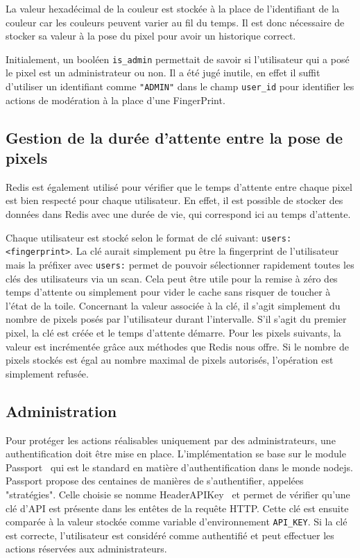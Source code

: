 La valeur hexadécimal de la couleur est stockée à la place de l'identifiant de la couleur car les couleurs peuvent varier au fil du temps. Il est donc nécessaire de stocker sa valeur à la pose du pixel pour avoir un historique correct.

Initialement, un booléen \texttt{is\_admin} permettait de savoir si l'utilisateur qui a posé le pixel est un administrateur ou non. Il a été jugé inutile, en effet il suffit d'utiliser un identifiant comme \texttt{"ADMIN"} dans le champ \texttt{user\_id} pour identifier les actions de modération à la place d'une FingerPrint.

\subsection{Gestion de la durée d'attente entre la pose de pixels}

Redis est également utilisé pour vérifier que le temps d'attente entre chaque pixel est bien respecté pour chaque utilisateur. En effet, il est possible de stocker des données dans Redis avec une durée de vie, qui correspond ici au temps d'attente.

Chaque utilisateur est stocké selon le format de clé suivant: \texttt{users:<fingerprint>}. La clé aurait simplement pu être la fingerprint de l'utilisateur mais la préfixer avec \texttt{users:} permet de pouvoir sélectionner rapidement toutes les clés des utilisateurs via un scan. Cela peut être utile pour la remise à zéro des temps d'attente ou simplement pour vider le cache sans risquer de toucher à l'état de la toile. Concernant la valeur associée à la clé, il s'agit simplement du nombre de pixels posés par l'utilisateur durant l'intervalle. S'il s'agit du premier pixel, la clé est créée et le temps d'attente démarre. Pour les pixels suivants, la valeur est incrémentée grâce aux méthodes que Redis nous offre. Si le nombre de pixels stockés est égal au nombre maximal de pixels autorisés, l'opération est simplement refusée.

\subsection{Administration}
\label{section:administration}

Pour protéger les actions réalisables uniquement par des administrateurs, une authentification doit être mise en place. L'implémentation se base sur le module Passport~\cite{passport} qui est le standard en matière d'authentification dans le monde \gls{nodejs}. Passport propose des centaines de manières de s'authentifier, appelées "stratégies". Celle choisie se nomme HeaderAPIKey~\cite{passport-headerapikey} et permet de vérifier qu'une clé d'API est présente dans les entêtes de la requête HTTP. Cette clé est ensuite comparée à la valeur stockée comme variable d'environnement \texttt{API\_KEY}. Si la clé est correcte, l'utilisateur est considéré comme authentifié et peut effectuer les actions réservées aux administrateurs.

